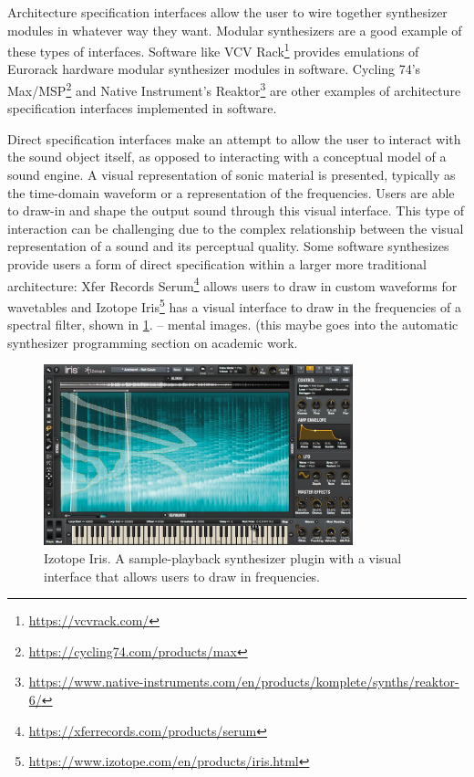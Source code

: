Architecture specification interfaces allow the user to wire together synthesizer modules in whatever way they want. Modular synthesizers are a good example of these types of interfaces. Software like VCV Rack\footnote{\url{https://vcvrack.com/}} provides emulations of Eurorack \cite{intellijel2019} hardware modular synthesizer modules in software. Cycling 74's Max/MSP\footnote{\url{https://cycling74.com/products/max}} and Native Instrument's Reaktor\footnote{\url{https://www.native-instruments.com/en/products/komplete/synths/reaktor-6/}} are other examples of architecture specification interfaces implemented in software.

Direct specification interfaces make an attempt to allow the user to interact with the sound object itself, as opposed to interacting with a conceptual model of a sound engine. A visual representation of sonic material is presented, typically as the time-domain waveform or a representation of the frequencies. Users are able to draw-in and shape the output sound through this visual interface. This type of interaction can be challenging due to the complex relationship between the visual representation of a sound and its perceptual quality. Some software synthesizes provide users a form of direct specification within a larger more traditional architecture: Xfer Records Serum\footnote{\url{https://xferrecords.com/products/serum}} allows users to draw in custom waveforms for wavetables and Izotope Iris\footnote{\url{https://www.izotope.com/en/products/iris.html}} has a visual interface to draw in the frequencies of a spectral filter, shown in \ref{fig:izotope_iris}. \cite{knees2016searching} -- mental images. (this maybe goes into the automatic synthesizer programming section on academic work.

\begin{figure}[ht]
    \centering
    \includegraphics[width=0.80\textwidth]{figures/background/izotope_iris.jpg}
    \caption{Izotope Iris. A sample-playback synthesizer plugin with a visual interface that allows users to draw in frequencies.}
    \label{fig:izotope_iris}
\end{figure}

